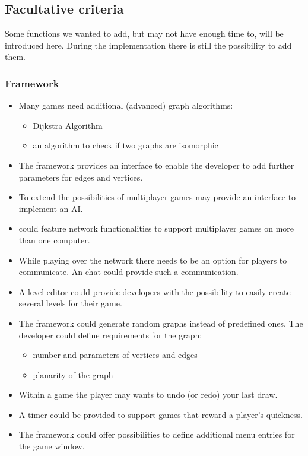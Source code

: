 \subsection{Facultative criteria}\label{REF:FACULTATIVE-CRITERIA}
Some functions we wanted to add, but may not have enough time to, will be introduced here. During the implementation there is still the possibility to add them.

\subsubsection{Framework}
\begin{itemize}

	\item Many \glspl{game} need additional (advanced) \gls{graph} \glspl{algorithm}:
	\begin{itemize}
		\item Dijkstra Algorithm
		\item an algorithm to check if two graphs are isomorphic
	\end{itemize}

	\item The framework provides an interface to enable the developer to add further parameters for edges and vertices.
	\item To extend the possibilities of multiplayer games {\graphioli} may provide an interface to implement an \gls{AI}.

	\item {\graphioli} could feature network functionalities to support multiplayer games on more than one computer.

	\item While playing over the network there needs to be an option for players to communicate. An \gls{chat} could provide such a communication.

	\item A \gls{level-editor} could provide \glspl{developer} with the possibility to easily create several levels for their game.

	\item The framework could generate random graphs instead of predefined ones. The developer could define requirements for the graph:
	\begin{itemize}
		\item number and parameters of vertices and edges
		\item planarity of the graph
	\end{itemize}

	\item Within a game the player may wants to \gls{undo} (or \gls{redo}) your last draw.

	\item A timer could be provided to support games that reward a player's quickness.

	\item The framework could offer possibilities to define additional menu entries for the game window.

\end{itemize}

